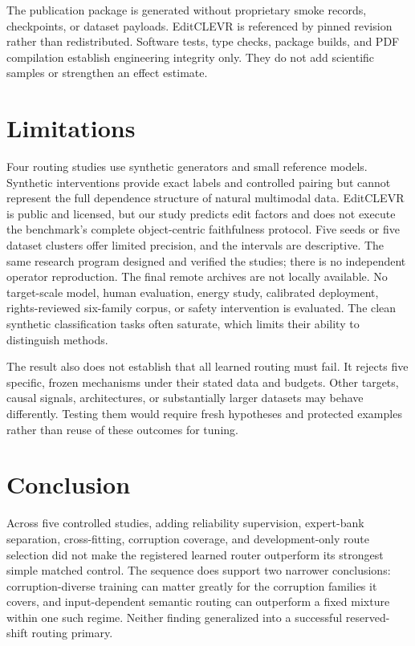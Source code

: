 \documentclass[10pt]{article}
\begin{document}
The publication package is generated without proprietary smoke records, checkpoints, or
dataset payloads. EditCLEVR is referenced by pinned revision rather than redistributed.
Software tests, type checks, package builds, and PDF compilation establish engineering
integrity only. They do not add scientific samples or strengthen an effect estimate.

\section{Limitations}
Four routing studies use synthetic generators and small reference models. Synthetic
interventions provide exact labels and controlled pairing but cannot represent the full
dependence structure of natural multimodal data. EditCLEVR is public and licensed, but our
study predicts edit factors and does not execute the benchmark's complete object-centric
faithfulness protocol. Five seeds or five dataset clusters offer limited precision, and the
intervals are descriptive. The same research program designed and verified the studies;
there is no independent operator reproduction. The final remote archives are not locally
available. No target-scale model, human evaluation, energy study, calibrated deployment,
rights-reviewed six-family corpus, or safety intervention is evaluated. The clean synthetic
classification tasks often saturate, which limits their ability to distinguish methods.

The result also does not establish that all learned routing must fail. It rejects five
specific, frozen mechanisms under their stated data and budgets. Other targets, causal
signals, architectures, or substantially larger datasets may behave differently. Testing
them would require fresh hypotheses and protected examples rather than reuse of these
outcomes for tuning.

\section{Conclusion}
Across five controlled studies, adding reliability supervision, expert-bank separation,
cross-fitting, corruption coverage, and development-only route selection did not make the
registered learned router outperform its strongest simple matched control. The sequence
does support two narrower conclusions: corruption-diverse training can matter greatly for
the corruption families it covers, and input-dependent semantic routing can outperform a
fixed mixture within one such regime. Neither finding generalized into a successful
reserved-shift routing primary.
\end{document}
